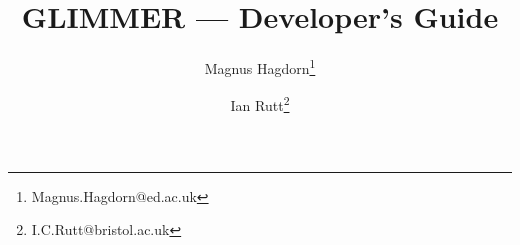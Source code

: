 \newcommand{\dir}{dg}

\pagestyle{myheadings}


\title{GLIMMER --- Developer's Guide}
\author{Magnus Hagdorn\thanks{Magnus.Hagdorn@ed.ac.uk} \and Ian Rutt\thanks{I.C.Rutt@bristol.ac.uk}}
\maketitle
\tableofcontents
\newpage


